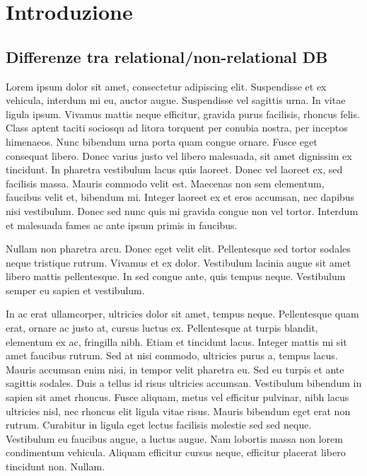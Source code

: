 \chapter{Introduzione}

\section{Differenze tra relational/non-relational DB}
Lorem ipsum dolor sit amet, consectetur adipiscing elit. Suspendisse et ex vehicula, interdum mi eu, auctor augue. Suspendisse vel sagittis urna. In vitae ligula ipsum. Vivamus mattis neque efficitur, gravida purus facilisis, rhoncus felis. Class aptent taciti sociosqu ad litora torquent per conubia nostra, per inceptos himenaeos. Nunc bibendum urna porta quam congue ornare. Fusce eget consequat libero. Donec varius justo vel libero malesuada, sit amet dignissim ex tincidunt. In pharetra vestibulum lacus quis laoreet. Donec vel laoreet ex, sed facilisis massa. Mauris commodo velit est. Maecenas non sem elementum, faucibus velit et, bibendum mi. Integer laoreet ex et eros accumsan, nec dapibus nisi vestibulum. Donec sed nunc quis mi gravida congue non vel tortor. Interdum et malesuada fames ac ante ipsum primis in faucibus.

Nullam non pharetra arcu. Donec eget velit elit. Pellentesque sed tortor sodales neque tristique rutrum. Vivamus et ex dolor. Vestibulum lacinia augue sit amet libero mattis pellentesque. In sed congue ante, quis tempus neque. Vestibulum semper eu sapien et vestibulum.

In ac erat ullamcorper, ultricies dolor sit amet, tempus neque. Pellentesque quam erat, ornare ac justo at, cursus luctus ex. Pellentesque at turpis blandit, elementum ex ac, fringilla nibh. Etiam et tincidunt lacus. Integer mattis mi sit amet faucibus rutrum. Sed at nisi commodo, ultricies purus a, tempus lacus. Mauris accumsan enim nisi, in tempor velit pharetra eu. Sed eu turpis et ante sagittis sodales. Duis a tellus id risus ultricies accumsan. Vestibulum bibendum in sapien sit amet rhoncus. Fusce aliquam, metus vel efficitur pulvinar, nibh lacus ultricies nisl, nec rhoncus elit ligula vitae risus. Mauris bibendum eget erat non rutrum. Curabitur in ligula eget lectus facilisis molestie sed sed neque. Vestibulum eu faucibus augue, a luctus augue. Nam lobortis massa non lorem condimentum vehicula. Aliquam efficitur cursus neque, efficitur placerat libero tincidunt non. Nullam.


